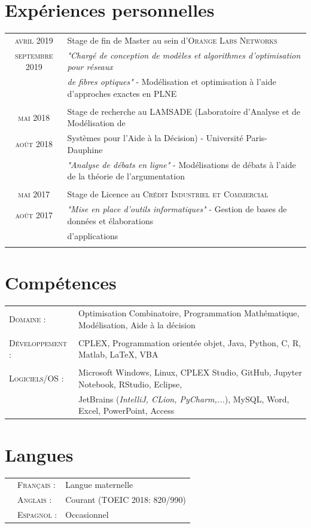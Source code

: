\documentclass[a4paper,10pt]{article}
\begin{document}
\section{Expériences personnelles}
\begin{tabular}{c|l}	
 \textsc{avril} 2019 & Stage de fin de Master au sein d’\textsc{Orange Labs Networks} \\ 
 \textsc{septembre} 2019 & \emph{"Chargé de conception de modèles et algorithmes d'optimisation pour réseaux}\\
 & \emph{de fibres optiques"}\small{ - Modélisation et optimisation à l'aide d'approches exactes en PLNE}\\\multicolumn{2}{c}{} \\
 \textsc{mai} 2018 & Stage de recherche au \textsc{LAMSADE} (Laboratoire d'Analyse et de Modélisation de\\  \textsc{août} 2018 & Systèmes pour l'Aide à la Décision) - Université Paris-Dauphine\\
  & \emph{"Analyse de débats en ligne"}\small{ - Modélisations de débats à l'aide de la théorie de l'argumentation}\\\multicolumn{2}{c}{} \\
 \textsc{mai} 2017 & Stage de Licence au \textsc{Crédit Industriel et Commercial}\\
 \textsc{août} 2017 & \emph{"Mise en place d'outils informatiques"}\small{ - Gestion de bases de données et élaborations} \\ &  \small{d'applications}\\\multicolumn{2}{c}{}
 \end{tabular}

\section{Compétences}

\begin{tabular}{l p{15cm}}	
\textsc{Domaine :}    &   Optimisation Combinatoire, Programmation Mathématique, Modélisation, Aide à la décision\\&\\
\textsc{Développement :} & CPLEX, Programmation orientée objet, Java, Python, C, R, Matlab, \LaTeX, VBA\\&\\
\textsc{Logiciels/OS :}&  Microsoft Windows, Linux, CPLEX  Studio, GitHub, Jupyter Notebook, RStudio, Eclipse, \\
     &                    JetBrains (\emph{IntelliJ, CLion, PyCharm,...}), MySQL, Word, Excel, PowerPoint, Access
\end{tabular}


\section{Langues}
\begin{flushleft}
\begin{tabular}{p{0.05cm}ll}
&\textsc{Français :}&Langue maternelle\\
&\textsc{Anglais :}&Courant (TOEIC 2018: 820/990)\\
&\textsc{Espagnol :}&Occasionnel
\end{tabular}
\end{flushleft}
\end{document}
